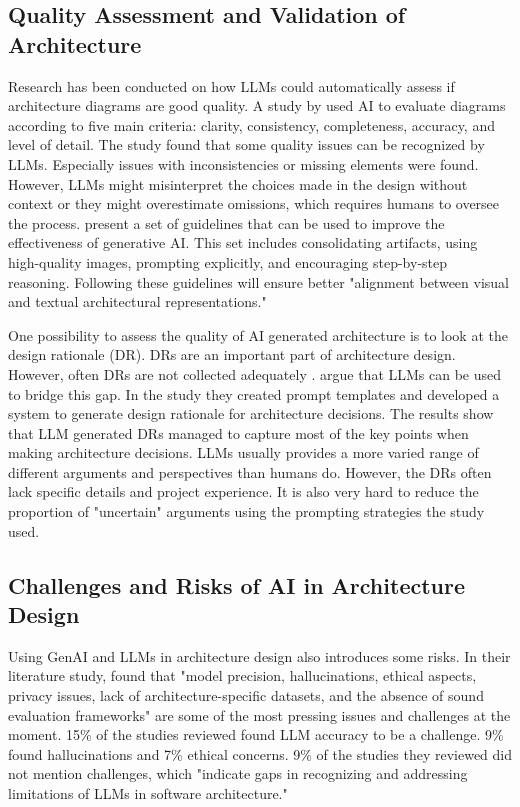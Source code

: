 \subsection{Quality Assessment and Validation of Architecture}

Research has been conducted on how LLMs could automatically assess if architecture diagrams are good quality. A study by \textcite{deoliveiraLLMBasedQualityAssessment2026} used AI to evaluate diagrams according to five main criteria: clarity, consistency, completeness, accuracy, and level of detail. The study found that some quality issues can be recognized by LLMs. Especially issues with inconsistencies or missing elements were found. However, LLMs might misinterpret the choices made in the design without context or they might overestimate omissions, which requires humans to oversee the process. \citeauthor{deoliveiraLLMBasedQualityAssessment2026} present a set of guidelines that can be used to improve the effectiveness of generative AI. This set includes consolidating artifacts, using high-quality images, prompting explicitly, and encouraging step-by-step reasoning. Following these guidelines will ensure better
"alignment between visual and textual architectural representations."

One possibility to assess the quality of AI generated architecture is to look at the design rationale (DR). DRs are an important part of architecture design. However, often DRs are not collected adequately \parencite{tyreeArchitectureDecisionsDemystifying2005}. \textcite{zhouUsingLLMsGenerating2025} argue that LLMs can be used to bridge this gap. In the study they created prompt templates and developed a system to generate design rationale for architecture decisions. The results show that LLM generated DRs managed to capture most of the key points when making architecture decisions. LLMs usually provides a more varied range of different arguments and perspectives than humans do. However, the DRs often lack specific details and project experience. It is also very hard to reduce the proportion of "uncertain" arguments using the prompting strategies the study used.

\subsection{Challenges and Risks of AI in Architecture Design}
Using GenAI and LLMs in architecture design also introduces some risks. In their literature study, \textcite{espositoGenerativeAISoftware2026} found that "model precision, hallucinations, ethical aspects, privacy issues, lack of architecture-specific datasets, and the absence of sound evaluation frameworks" are some of the most pressing issues and challenges at the moment. 15\% of the studies reviewed found LLM accuracy to be a challenge. 9\% found hallucinations and 7\% ethical concerns. 9\% of the studies they reviewed did not mention challenges, which "indicate gaps in recognizing and addressing limitations of LLMs in software architecture."

